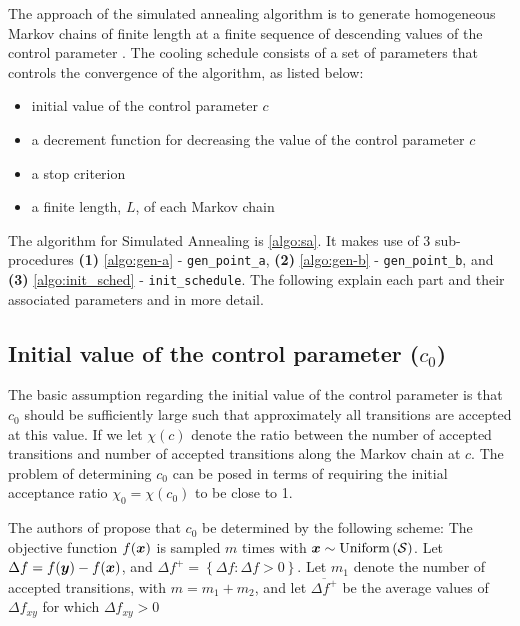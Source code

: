 \hspace*{3mm}The approach of the simulated annealing algorithm is to generate homogeneous Markov chains of finite length at a finite sequence of descending values of the control parameter \cite{dekkers}. The cooling schedule consists of a set of parameters that controls the convergence of the algorithm, as listed below: \\
\begin{itemize}
\item initial value of the control parameter $c$ 
\item a decrement function for decreasing the value of the control parameter $c$
\item a stop criterion
\item a finite length, $L$, of each Markov chain\\ \cite{dekkers}   
\end{itemize}

The algorithm for Simulated Annealing is \cref{algo:sa}. It makes use of 3 sub-procedures \textbf{(1)} \cref{algo:gen-a}
 - \texttt{gen\_point\_a}, \textbf{(2)} \cref{algo:gen-b} - \texttt{gen\_point\_b}, and \textbf{(3)} \cref{algo:init_sched}
  - \texttt{init\_schedule}. The following explain each part and their associated parameters and in more detail.

\subsection{Initial value of the control parameter ($c_0$)}

The basic assumption regarding the initial value of the control parameter is that $c_0$ should be sufficiently large such that approximately all transitions are accepted at this value. If we let $\chi(c)$ denote the ratio between the number of accepted transitions and number of accepted transitions along the Markov chain at $c$. The problem of determining $c_0$ can be posed in terms of requiring
the initial acceptance ratio $\chi_0=\chi(c_0)$ to be close to 1.

The authors of \cite{dekkers} propose that $c_0$ be determined by the following scheme: The objective function $f(\boldsymbol{x})$ is sampled
$m$ times with $\boldsymbol{x} \sim \mathrm{Uniform}\left( \mathcal{S}\right)$. Let $\Delta f = f(\boldsymbol{y}) - f(\boldsymbol{x})$, and
$\Delta f^+ = \left\lbrace \Delta f : \Delta f > 0 \right\rbrace$. Let $m_1$ denote the number of accepted transitions, with
$m=m_1+m_2$, and let $\overline{\Delta f^+}$ be the average values of $\Delta f_{xy}$ for which $\Delta f_{xy}>0$

